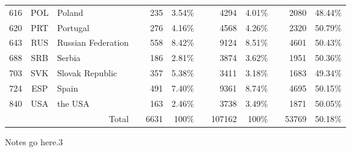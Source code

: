 {\begin{tabular}{ccl c rr c rr c rr}
      616   & POL   & Poland &       & 235   & 3.54\% &       & 4294  & 4.01\% &       & 2080  & 48.44\% \\
      620   & PRT   & Portugal &       & 276   & 4.16\% &       & 4568  & 4.26\% &       & 2320  & 50.79\% \\
      643   & RUS   & Russian Federation &       & 558   & 8.42\% &       & 9124  & 8.51\% &       & 4601  & 50.43\% \\
      688   & SRB   & Serbia &       & 186   & 2.81\% &       & 3874  & 3.62\% &       & 1951  & 50.36\% \\
      703   & SVK   & Slovak Republic &       & 357   & 5.38\% &       & 3411  & 3.18\% &       & 1683  & 49.34\% \\
      724   & ESP   & Spain &       & 491   & 7.40\% &       & 9361  & 8.74\% &       & 4695  & 50.15\% \\
      840   & USA   & the USA &       & 163   & 2.46\% &       & 3738  & 3.49\% &       & 1871  & 50.05\% \\
      \midrule
            &       & \multicolumn{1}{r}{Total} &       & 6631  & 100\% &       & 107162 & 100\% &       & 53769 & 50.18\% \\
      \end{tabular}
}{Notes go here.}{3}